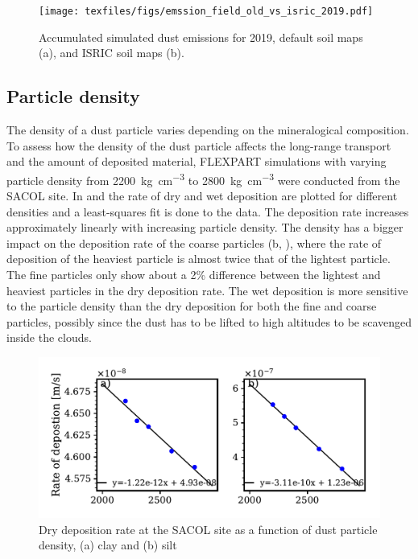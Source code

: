 \begin{figure}[htpb]
    \centering
    \texttt{[image: texfiles/figs/emssion\_field\_old\_vs\_isric\_2019.pdf]}
    \caption{Accumulated simulated dust emissions for 2019, default soil maps (a), and ISRIC soil maps (b).}
    \label{fig:emissions_ISRIC_old_com}
\end{figure}
\subsection{Particle density}\label{sec:density_experiment}
The density of a dust particle varies depending on the mineralogical composition. 
To assess how the density of the dust particle affects the long-range transport and the amount of deposited material,
FLEXPART simulations with varying particle density from \SI{2200}{\kg\per\cubic\cm} to \SI{2800}{\kg\per\cubic\cm}  were conducted from the SACOL site. 
In  and  the rate of dry and wet deposition are plotted for different densities and a least-squares fit is done to the data. 
The deposition rate increases approximately linearly with increasing particle density. 
The density has a bigger impact on the deposition rate of the coarse particles (b, ), where the rate of deposition of the heaviest particle is almost twice that of the lightest particle. 
The fine particles only show about a 2\% difference between the lightest and heaviest particles in the dry deposition rate. 
The wet deposition is more sensitive to the particle density than the dry deposition for both the fine and coarse particles, possibly since the dust has to be lifted to high altitudes to be scavenged inside the clouds. 
\begin{figure}[hptb]
    \centering
    \includegraphics[width=\textwidth]{texfiles/figs/drydep_function_of_density.pdf}
    \caption{Dry deposition rate at the SACOL site as a function of dust particle density, (a) clay and (b) silt}
    \label{fig:dry_dep_density}
\end{figure}

